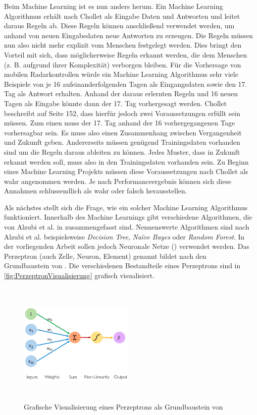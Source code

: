 Beim Machine Learning ist es nun anders herum.
Ein Machine Learning Algorithmus erhält nach Chollet als Eingabe Daten und Antworten und leitet daraus Regeln ab.
Diese Regeln können anschließend verwendet werden, um anhand von neuen Eingabedaten neue Antworten zu erzeugen.
Die Regeln müssen nun also nicht mehr explizit vom Menschen festgelegt werden.
Dies bringt den Vorteil mit sich, dass möglicherweise Regeln erkannt werden, die dem Menschen (z. B. aufgrund ihrer Komplexität) verborgen bleiben.
Für die Vorhersage von mobilen Radarkontrollen würde ein Machine Learning Algorithmus sehr viele Beispiele von je 16 aufeinanderfolgenden Tagen als Eingangsdaten sowie den 17. Tag als Antwort erhalten.
Anhand der daraus erlernten Regeln und 16 neuen Tagen als Eingabe könnte dann der 17. Tag vorhergesagt werden.
Chollet beschreibt auf Seite 152, dass hierfür jedoch zwei Voraussetzungen erfüllt sein müssen.
Zum einen muss der 17. Tag anhand der 16 vorhergegangenen Tage vorhersagbar sein.
Es muss also einen Zusammenhang zwischen Vergangenheit und Zukunft geben.
Andererseits müssen genügend Trainingsdaten vorhanden sind um die Regeln daraus ableiten zu können.
Jedes Muster, dass in Zukunft erkannt werden soll, muss also in den Trainingsdaten vorhanden sein.
Zu Beginn eines Machine Learning Projekts müssen diese Voraussetzungen nach Chollet als wahr angenommen werden.
Je nach Performanceergebnis können sich diese Annahmen schlussendlich als wahr oder falsch herausstellen.

Als nächstes stellt sich die Frage, wie ein solcher Machine Learning Algorithmus funktioniert.
Innerhalb des Machine Learnings gibt verschiedene Algorithmen, die von Alzubi et al. in \cite{MachineLearningOverview} zusammengefasst sind.
Nennenswerte Algorithmen sind nach Alzubi et al. beispielsweise \emph{Decision Tree}, \emph{Na\"ive Bayes} oder \emph{Random Forest}.
In der vorliegenden Arbeit sollen jedoch Neuronale Netze () verwendet werden.
Das Perzeptron (auch Zelle, Neuron, Element) genannt bildet nach \cite{6S191Intro} den Grundbaustein von .
Die verschiedenen Bestandteile eines Perzeptrons sind in \autoref{fig:PerzeptronVisualisierung} grafisch visualisiert.

\begin{figure}[h]
    \centering
    \includegraphics[width=0.5\textwidth,height=6cm,keepaspectratio=true]{content/images/PerzeptronVisualisierung.png}
    \caption{Grafische Visualisierung eines Perzeptrons als Grundbaustein von  \cite{6S191Intro}}
    \label{fig:PerzeptronVisualisierung}
\end{figure}

